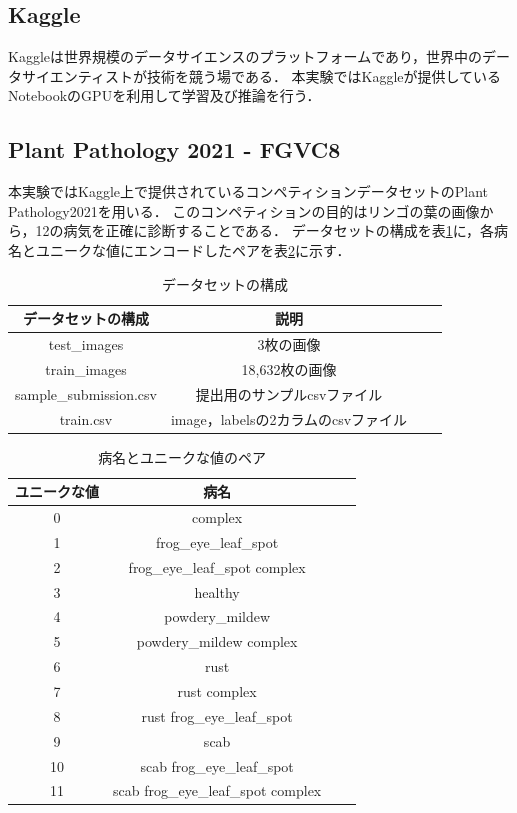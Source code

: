 \documentclass[a4paper, oneside, openany, dvipdfmx]{suribt}%
\newcommand{\tref}[1]{表\ref{#1}}
\begin{document}
\subsection{Kaggle}
Kaggleは世界規模のデータサイエンスのプラットフォームであり，世界中のデータサイエンティストが技術を競う場である．
本実験ではKaggleが提供しているNotebookのGPUを利用して学習及び推論を行う．
\subsection{Plant Pathology 2021 - FGVC8}
本実験ではKaggle上で提供されているコンペティションデータセットのPlant Pathology2021を用いる．
このコンペティションの目的はリンゴの葉の画像から，12の病気を正確に診断することである．
データセットの構成を\tref{tb:dataset}に，各病名とユニークな値にエンコードしたペアを\tref{tb:labels}に示す．
\begin{table}[H]
  \caption{データセットの構成}
  \label{tb:dataset}
  \centering\begin{tabular}{c|ccc}\hline
    データセットの構成 & 説明\\ \hline
    test\_images & 3枚の画像\\ \hline
    train\_images & 18,632枚の画像\\ \hline
    sample\_submission.csv & 提出用のサンプルcsvファイル\\ \hline
    train.csv & image，labelsの2カラムのcsvファイル\\ \hline
  \end{tabular}
\end{table}
\begin{table}[H]
  \caption{病名とユニークな値のペア}
  \label{tb:labels}
  \centering\begin{tabular}{c|ccc}\hline
    ユニークな値 & 病名\\ \hline
    0 & complex\\ \hline
    1 & frog\_eye\_leaf\_spot\\ \hline
    2 & frog\_eye\_leaf\_spot complex\\ \hline
    3 & healthy\\ \hline
    4 & powdery\_mildew\\ \hline
    5 & powdery\_mildew complex\\ \hline
    6 & rust\\ \hline
    7 & rust complex\\ \hline
    8 & rust frog\_eye\_leaf\_spot\\ \hline
    9 & scab\\ \hline
    10 & scab frog\_eye\_leaf\_spot\\ \hline
    11 & scab frog\_eye\_leaf\_spot complex\\ \hline
  \end{tabular}
\end{table}
\end{document}
